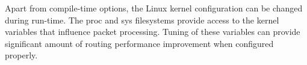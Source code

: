 Apart from compile-time options, the Linux kernel configuration can be changed during run-time.
The proc and sys filesystems provide access to the kernel variables that influence packet processing.
Tuning of these variables can provide significant amount of routing performance improvement when configured properly.







